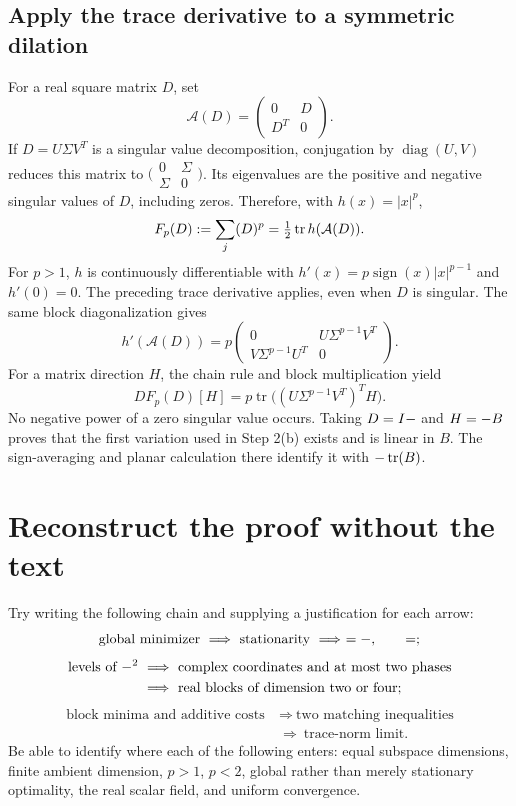 \documentclass[11pt]{article}
\numberwithin{equation}{section}
\newcommand{\W}{\sym{Wcompetitor}}
\newcommand{\Ggrad}{\sym{SpectralGradient}}
\newcommand{\Jsrc}{\sym{Jreflect}}
\begin{document}
\subsection*{Apply the trace derivative to a symmetric dilation}
For a real square matrix $D$, set
\[
 \mathcal A(D)=\begin{pmatrix}0&D\\D^T&0\end{pmatrix}.
\]
If $D=U\Sigma V^T$ is a singular value decomposition, conjugation by
$\operatorname{diag}(U,V)$ reduces this matrix to
$\bigl(\begin{smallmatrix}0&\Sigma\\\Sigma&0\end{smallmatrix}\bigr)$.
Its eigenvalues are the positive and negative singular values of $D$,
including zeros. Therefore, with $h(x)=|x|^p$,
\[
 F_p(D):=\sum_j \sym{SingularValue}(D)^p
       =\tfrac12\operatorname{tr}h(\mathcal A(D)).
\]
For $p>1$, $h$ is continuously differentiable with
$h'(x)=p\operatorname{sign}(x)|x|^{p-1}$ and $h'(0)=0$.
The preceding trace derivative applies, even when $D$ is singular.
The same block diagonalization gives
\[
 h'(\mathcal A(D))=
 p\begin{pmatrix}0&U\Sigma^{p-1}V^T\\
                       V\Sigma^{p-1}U^T&0\end{pmatrix}.
\]
For a matrix direction $H$, the chain rule and block multiplication yield
\[
 DF_p(D)[H]
       =p\operatorname{tr}\bigl((U\Sigma^{p-1}V^T)^T H\bigr).
\]
No negative power of a zero singular value occurs.
Taking $D=I-\W$ and $H=-\W B$ proves that the first variation used in
Step 2(b) exists and is linear in $B$. The sign-averaging and planar
calculation there identify it with $-\operatorname{tr}(\Ggrad B)$.

\section{Reconstruct the proof without the text}

Try writing the following chain and supplying a justification for each arrow:
\[
 \text{global minimizer}
 \ \Longrightarrow\ \text{stationarity}
 \ \Longrightarrow\ \Jsrc\Ggrad\Jsrc=-\Ggrad,
 \qquad \Ggrad\W=\W\Ggrad;
\]
\[
 \begin{aligned}
 \text{levels of }-\Ggrad^2
 &\ \Longrightarrow\ \text{complex coordinates and at most two phases}\\
 &\ \Longrightarrow\ \text{real blocks of dimension two or four};
 \end{aligned}
\]
\[
 \begin{aligned}
 \text{block minima and additive costs}
 &\ \Longrightarrow\ \text{two matching inequalities}\\
 &\ \Longrightarrow\ \text{trace-norm limit}.
 \end{aligned}
\]
Be able to identify where each of the following enters: equal subspace
dimensions, finite ambient dimension, $p>1$, $p<2$, global rather than
merely stationary optimality, the real scalar field, and uniform convergence.
\end{document}
